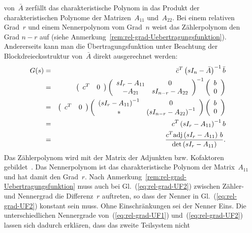 \begin{remark}
von~$\bar{A}$ zerfällt das charakteristische Polynom in das Produkt
der charakteristischen Polynome der Matrizen~$A_{11}$ und~$A_{22}$.
Bei einem relativen Grad~$r$ und einem Nennerpolynom vom Grad~$n$
weist das Zählerpolynom den Grad $n-r$ auf (siehe Anmerkung~\ref{rem:rel-grad-Uebertragungsfunktion}).
Andererseits kann man die Übertragungsfunktion unter Beachtung der
Block\-dreiecks\-struktur von~$\bar{A}$ direkt ausgerechnet werden:
\begin{eqnarray}
G(s) & = & \bar{c}^{T}\left(sI_{n}-\bar{A}\right)^{-1}\bar{b}\nonumber \\
 & = & \left(\begin{array}{cc}
c^{T} & 0\end{array}\right)\left(\begin{array}{cc}
sI_{r}-A_{11} & 0\\
-A_{21} & sI_{n-r}-A_{22}
\end{array}\right)^{-1}\left(\begin{array}{l}
b\\
0
\end{array}\right)\nonumber \\
 & = & \left(\begin{array}{cc}
c^{T} & 0\end{array}\right)\left(\begin{array}{cc}
\left(sI_{r}-A_{11}\right)^{-1} & 0\\
* & \left(sI_{n-r}-A_{22}\right)^{-1}
\end{array}\right)\left(\begin{array}{l}
b\\
0
\end{array}\right)\nonumber \\
 & = & c^{T}\left(sI_{r}-A_{11}\right)^{-1}b\nonumber \\
 & = & \frac{c^{T}{\operatorname{adj}}\left(sI_{r}-A_{11}\right)\,b}{\det\left(sI_{r}-A_{11}\right)}.\label{eq:rel-grad-UF2}
\end{eqnarray}
Das Zählerpolynom wird mit der Matrix der Adjunkten bzw. Kofaktoren
gebildet~\cite{reinschke88}. Das Nennerpolynom ist das charakteristische
Polynom der Matrix~$A_{11}$ und hat damit den Grad~$r$. Nach Anmerkung~\ref{rem:rel-grad-Uebertragungsfunktion}
muss auch bei Gl.~(\ref{eq:rel-grad-UF2}) zwischen Zähler- und Nennergrad
die Differenz~$r$ auftreten, so dass der Nenner in Gl.~(\ref{eq:rel-grad-UF2})
konstant sein muss. Ohne Einschränkungen sei der Nenner Eins. Die
unterschiedlichen Nennergrade von~(\ref{eq:rel-grad-UF1}) und~(\ref{eq:rel-grad-UF2})
lassen sich dadurch erklären, dass das zweite Teil\-system nicht

\end{remark}
